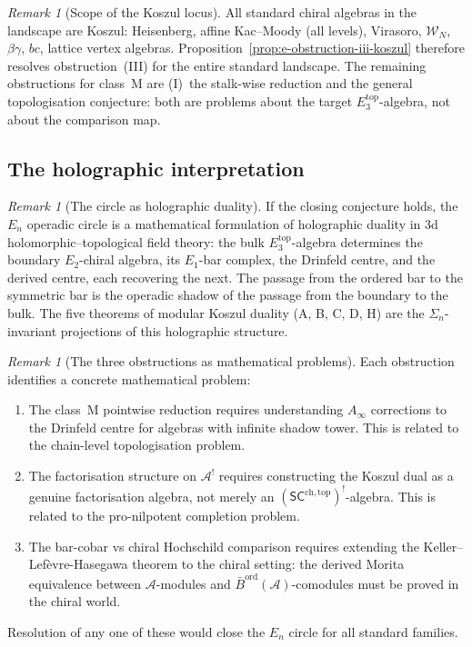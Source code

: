 \documentclass[11pt,reqno]{amsart}
\theoremstyle{definition}
\theoremstyle{remark}
\newtheorem{remark}[theorem]{Remark}
\providecommand{\cA}{\mathcal{A}}
\providecommand{\cW}{\mathcal{W}}
\providecommand{\Ainf}{A_\infty}
\providecommand{\Eone}{E_1}
\providecommand{\Etwo}{E_2}
\providecommand{\Ethree}{E_3}
\providecommand{\En}{E_n}
\providecommand{\SCchtop}{\ensuremath{\mathsf{SC}^{\mathrm{ch,top}}}}
\providecommand{\Barord}{\bar{B}^{\mathrm{ord}}}
\begin{document}
\begin{remark}[Scope of the Koszul locus]
\label{rem:e-koszul-scope}
All standard chiral algebras in the landscape are Koszul:
Heisenberg, affine Kac--Moody (all levels), Virasoro,
$\cW_N$, $\beta\gamma$, $bc$, lattice vertex algebras.
Proposition~\ref{prop:e-obstruction-iii-koszul} therefore
resolves obstruction~(III) for the entire standard
landscape. The remaining obstructions for class~M are
(I)~the stalk-wise reduction and the general topologisation
conjecture: both are problems about the target
$\Ethree^{\mathrm{top}}$-algebra, not about the comparison
map.
\end{remark}

\subsection{The holographic interpretation}

\begin{remark}[The circle as holographic duality]
\label{rem:e-holographic}
If the closing conjecture holds, the $\En$ operadic circle
is a mathematical formulation of holographic duality in $3$d
holomorphic--topological field theory: the bulk
$\Ethree^{\mathrm{top}}$-algebra determines the boundary
$\Etwo$-chiral algebra, its $\Eone$-bar complex, the
Drinfeld centre, and the derived centre, each recovering
the next. The passage from the ordered bar to the symmetric
bar is the operadic shadow of the passage from the boundary
to the bulk. The five theorems of modular Koszul duality
(A, B, C, D, H) are the $\Sigma_n$-invariant projections
of this holographic structure.
\end{remark}

\begin{remark}[The three obstructions as mathematical problems]
\label{rem:e-three-problems}
Each obstruction identifies a concrete mathematical problem:
\begin{enumerate}[label=\textup{(\Roman*)}]
\item The class~M pointwise reduction requires understanding
 $\Ainf$ corrections to the Drinfeld centre for algebras
 with infinite shadow tower. This is related to the
 chain-level topologisation problem.
\item The factorisation structure on $\cA^!$ requires
 constructing the Koszul dual as a genuine factorisation
 algebra, not merely an $(\SCchtop)^!$-algebra. This is
 related to the pro-nilpotent completion problem.
\item The bar-cobar vs chiral Hochschild comparison requires
 extending the Keller--Lef\`evre-Hasegawa theorem to the
 chiral setting: the derived Morita equivalence between
 $\cA$-modules and $\Barord(\cA)$-comodules must be proved
 in the chiral world.
\end{enumerate}
Resolution of any one of these would close the $\En$ circle
for all standard families.
\end{remark}
\end{document}
